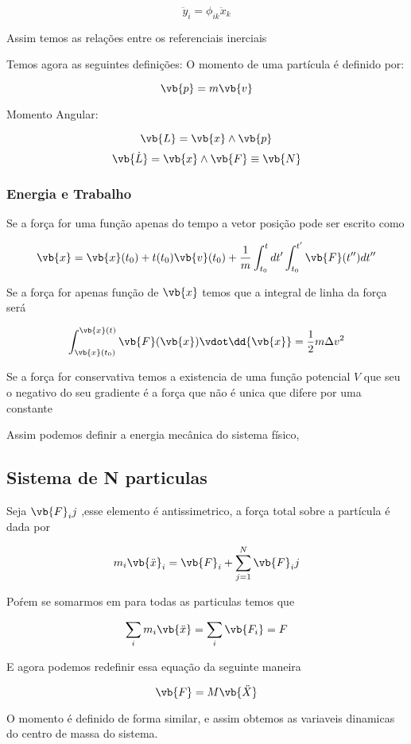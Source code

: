 \documentclass{article}
\begin{document}
$$\ddot{y}_i=\phi_{ik}\ddot{x}_k$$

Assim temos as relações entre os referenciais inerciais



Temos agora as seguintes definições: O momento de uma partícula é definido por:

$$\vb{p}=m\vb{v}$$


Momento Angular:

$$\vb{L}= \vb{x} \wedge \vb{p}$$
$$\vb{\dot{L}}=\vb{x} \land \vb{F} \equiv \vb{N}$$


\subsubsection{Energia e Trabalho}

Se a força for uma função apenas do tempo a vetor posição pode ser escrito como

$$\vb{x}=\vb{x}(t_0)+t(t_0)\vb{v}(t_0)+ \frac{1}{m} \int_{t_0}^{t}dt' \int_{t_0}^{t'}\vb{F}(t'')dt''$$

Se a força for apenas função de $\vb{x}$ temos que a integral de linha da força será

$$\int_{\vb{x}(t_0)}^{\vb{x}(t)} \vb{F}(\vb{x}) \vdot \dd{\vb{x}}= \frac{1}{2} m \Delta v^2$$

Se a força for conservativa temos a existencia de uma função potencial $V$ que seu o negativo do seu gradiente é a força que não é unica que difere por uma constante

Assim podemos definir a energia mecânica do sistema físico,
\newpage

\subsection*{Sistema de N particulas}

Seja $\vb{F}_ij$ ,esse elemento é antissimetrico, a força total sobre a partícula é dada por

$$m_i\vb{\ddot{x}}_i=\vb{F}_i+\sum_{j=1}^{N} \vb{F}_ij$$

Poŕem se somarmos em para todas as particulas temos que

$$\sum_{i}m_i \vb{\ddot{x}}=\sum_{i} \vb{F_i}=F$$

E agora podemos redefinir essa equação da seguinte maneira


$$\vb{F}=M\vb{\ddot{X}}$$

O momento é definido de forma similar, e assim obtemos as variaveis dinamicas do centro de massa do sistema.
\end{document}

